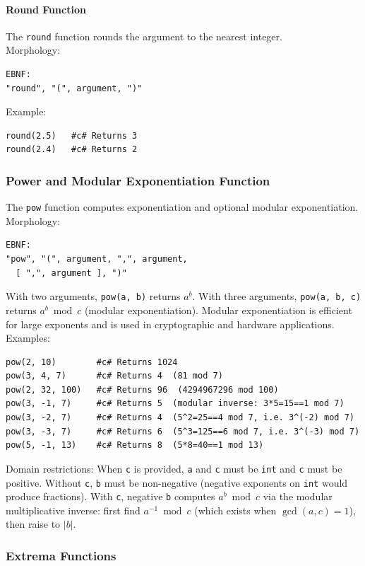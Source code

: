 \documentclass{report}
\begin{document}
\paragraph{Round Function}
The \texttt{round} function rounds the argument to the nearest integer. \\
Morphology:
\begin{verbatim}
EBNF:
"round", "(", argument, ")"
\end{verbatim}
Example:
\begin{verbatim}
round(2.5)   #c# Returns 3
round(2.4)   #c# Returns 2
\end{verbatim}

\subsubsection{Power and Modular Exponentiation Function}
The \texttt{pow} function computes exponentiation and optional modular exponentiation. \\
Morphology:
\begin{verbatim}
EBNF:
"pow", "(", argument, ",", argument, 
  [ ",", argument ], ")"
\end{verbatim}
With two arguments, \texttt{pow(a, b)} returns $a^b$. With three arguments, \texttt{pow(a, b, c)} returns $a^b \bmod c$ (modular exponentiation). Modular exponentiation is efficient for large exponents and is used in cryptographic and hardware applications. \\
Examples:
\begin{verbatim}
pow(2, 10)        #c# Returns 1024
pow(3, 4, 7)      #c# Returns 4  (81 mod 7)
pow(2, 32, 100)   #c# Returns 96  (4294967296 mod 100)
pow(3, -1, 7)     #c# Returns 5  (modular inverse: 3*5=15==1 mod 7)
pow(3, -2, 7)     #c# Returns 4  (5^2=25==4 mod 7, i.e. 3^(-2) mod 7)
pow(3, -3, 7)     #c# Returns 6  (5^3=125==6 mod 7, i.e. 3^(-3) mod 7)
pow(5, -1, 13)    #c# Returns 8  (5*8=40==1 mod 13)
\end{verbatim}
Domain restrictions: When \texttt{c} is provided, \texttt{a} and \texttt{c} must be \texttt{int} and \texttt{c} must be positive. Without \texttt{c}, \texttt{b} must be non-negative (negative exponents on \texttt{int} would produce fractions). With \texttt{c}, negative \texttt{b} computes $a^b \bmod c$ via the modular multiplicative inverse: first find $a^{-1} \bmod c$ (which exists when $\gcd(a, c) = 1$), then raise to $|b|$.

\subsubsection{Extrema Functions}
\end{document}
